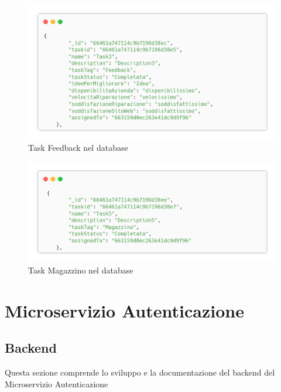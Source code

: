 \documentclass{report}
\begin{document}
\begin{figure}[H]
	\centering\includegraphics[width=1\textwidth]{images/database/feedback.png}
	\caption{Task Feedback nel database}
\end{figure}
\begin{figure}[H]
	\centering\includegraphics[width=1\textwidth]{images/database/magazzino.png}
	\caption{Task Magazzino nel database}
\end{figure}


\chapter{Microservizio Autenticazione}

\section{Backend}

Questa sezione comprende lo sviluppo e la documentazione del backend del Microservizio Autenticazione
\end{document}
